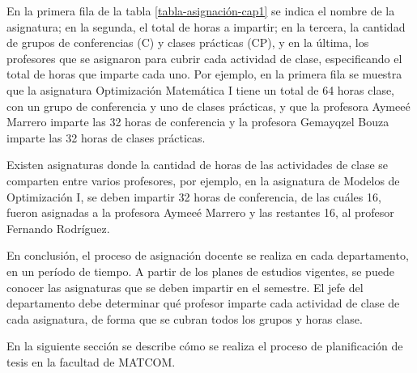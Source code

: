 En la primera fila de la tabla \ref{tabla-asignación-cap1} se indica 
el nombre de la asignatura; en la segunda, el total de horas a impartir; en la tercera, 
la cantidad de grupos de conferencias (C) y clases prácticas (CP), y en la última, los 
profesores que se asignaron para cubrir cada actividad de clase, especificando el total de horas que imparte cada uno. 
Por ejemplo, en la primera fila se muestra que la asignatura Optimización Matemática I tiene un total de 
64 horas clase, con un grupo de conferencia y uno de clases prácticas, y que la profesora Aymeeé Marrero imparte 
las 32 horas de conferencia y la profesora Gemayqzel Bouza imparte las 32 horas de clases prácticas.



Existen asignaturas donde la cantidad de horas de las actividades de clase se comparten entre varios profesores,
por ejemplo, en la asignatura de Modelos de Optimización I, se deben impartir 32 horas de conferencia,
de las cuáles 16, fueron asignadas a la profesora Aymeeé Marrero y las restantes 16, al profesor 
Fernando Rodríguez.



En conclusión, el proceso de asignación docente se realiza en cada departamento, en un período de 
tiempo. A partir de los planes de estudios vigentes, se puede conocer las asignaturas que se deben impartir 
en el semestre.
El jefe del departamento debe determinar qué profesor imparte cada actividad de clase de cada asignatura, 
de forma que se cubran todos los grupos y horas clase.





En la siguiente sección se describe cómo se realiza el proceso de planificación 
de tesis en la facultad de MATCOM.



